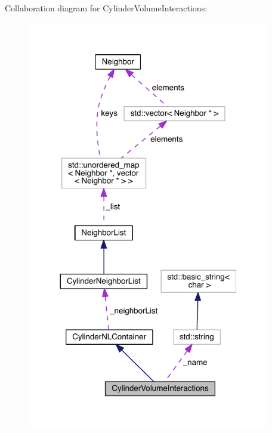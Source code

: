 Collaboration diagram for Cylinder\+Volume\+Interactions\+:\nopagebreak
\begin{figure}[H]
\begin{center}
\leavevmode
\includegraphics[width=300pt]{classCylinderVolumeInteractions__coll__graph}
\end{center}
\end{figure}
